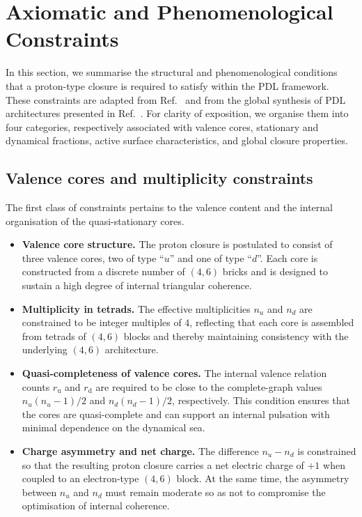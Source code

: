 \documentclass[11pt,a4paper]{article}
\theoremstyle{definition}
\begin{document}
\section{Axiomatic and Phenomenological Constraints}
\label{sec:constraints}

In this section, we summarise the structural and phenomenological conditions that a proton-type closure is required to satisfy within the PDL framework. These constraints are adapted from Ref.~\cite{Combinatorial_Proton_v2_2026} and from the global synthesis of PDL architectures presented in Ref.~\cite{PDL_Global_Mapping_2026}. For clarity of exposition, we organise them into four categories, respectively associated with valence cores, stationary and dynamical fractions, active surface characteristics, and global closure properties.

\subsection{Valence cores and multiplicity constraints}

The first class of constraints pertains to the valence content and the internal organisation of the quasi-stationary cores.

\begin{itemize}
  \item[(C1)] \textbf{Valence core structure.} The proton closure is postulated to consist of three valence cores, two of type ``$u$'' and one of type ``$d$''. Each core is constructed from a discrete number of $(4,6)$ bricks and is designed to sustain a high degree of internal triangular coherence.\cite{PDL_Main_2026,Combinatorial_Proton_v2_2026}
  \item[(C2)] \textbf{Multiplicity in tetrads.} The effective multiplicities $n_u$ and $n_d$ are constrained to be integer multiples of $4$, reflecting that each core is assembled from tetrads of $(4,6)$ blocks and thereby maintaining consistency with the underlying $(4,6)$ architecture.\cite{Combinatorial_Proton_v2_2026}
  \item[(C3)] \textbf{Quasi-completeness of valence cores.} The internal valence relation counts $r_{\mathrm{u}}$ and $r_{\mathrm{d}}$ are required to be close to the complete-graph values $n_u(n_u-1)/2$ and $n_d(n_d-1)/2$, respectively. This condition ensures that the cores are quasi-complete and can support an internal pulsation with minimal dependence on the dynamical sea.\cite{PDL_Main_2026,Combinatorial_Proton_v2_2026}
  \item[(C4)] \textbf{Charge asymmetry and net charge.} The difference $n_u - n_d$ is constrained so that the resulting proton closure carries a net electric charge of $+1$ when coupled to an electron-type $(4,6)$ block. At the same time, the asymmetry between $n_u$ and $n_d$ must remain moderate so as not to compromise the optimisation of internal coherence.\cite{PDL_Main_2026,PDL_Global_Mapping_2026}
\end{itemize}
\end{document}
